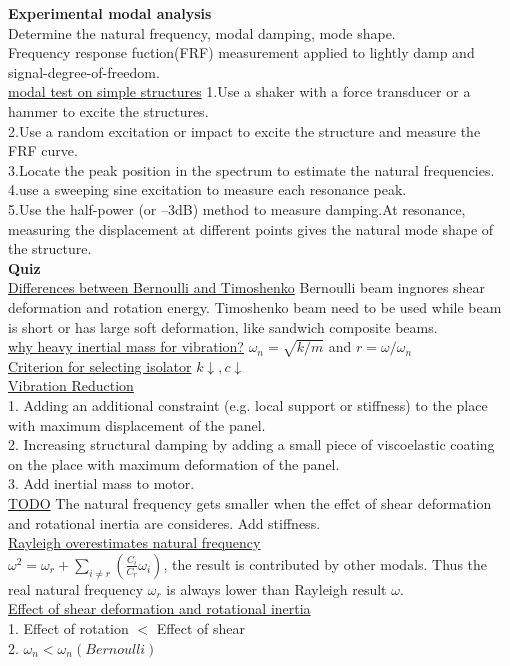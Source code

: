 \documentclass{article}
\begin{document}
\begin{multicols}{3}
\noindent\textbf{Experimental modal analysis}\\
Determine the natural frequency, modal damping, mode shape.\\
Frequency response fuction(FRF) measurement applied to lightly damp and signal-degree-of-freedom.\\
\underline{modal test on simple structures}
1.Use a shaker with a force transducer or a hammer to excite the structures.\\
2.Use a random excitation or impact to excite the structure and measure the FRF curve.\\
3.Locate the peak position in the spectrum to estimate the natural frequencies.\\
4.use a sweeping sine excitation to measure each resonance peak.\\
5.Use the half-power (or –3dB) method to measure damping.At resonance, measuring the displacement at different points gives the natural mode shape of the structure.\\

  \noindent\textbf{Quiz}\\
  \underline{Differences between Bernoulli and Timoshenko} Bernoulli beam ingnores shear deformation and rotation energy. Timoshenko beam need to be used while beam is short or has large soft deformation, like sandwich composite beams.\\
  \underline{why heavy inertial mass for vibration?} $\omega_n=\sqrt{k/m}$ and $r=\omega/\omega_n$\\
  \underline{Criterion for selecting isolator} $k \downarrow, c \downarrow$ \\
  \underline{Vibration Reduction}\\
  1. Adding an additional constraint (e.g. local support or stiffness) to the place with maximum displacement of the panel.\\
  2. Increasing structural damping by adding a small piece of viscoelastic coating on the place with maximum deformation of the panel. \\
  3. Add inertial mass to motor.\\
  \underline{TODO} The natural frequency gets smaller when the effct of shear deformation and rotational inertia are consideres. Add stiffness.\\
  \underline{Rayleigh overestimates natural frequency} \\
  $\omega^2 = \omega_r + \sum_{i\neq r}(\frac{C_i}{C_r}\omega_i)$, the result is contributed by other modals. Thus the real natural frequency $\omega_r$ is always lower than Rayleigh result $\omega$.\\
  \underline{Effect of shear deformation and rotational inertia} \\
  1. Effect of rotation $<$ Effect of shear \\
  2. $\omega_n < \omega_n(Bernoulli)$\\


\end{multicols}
\end{document}
